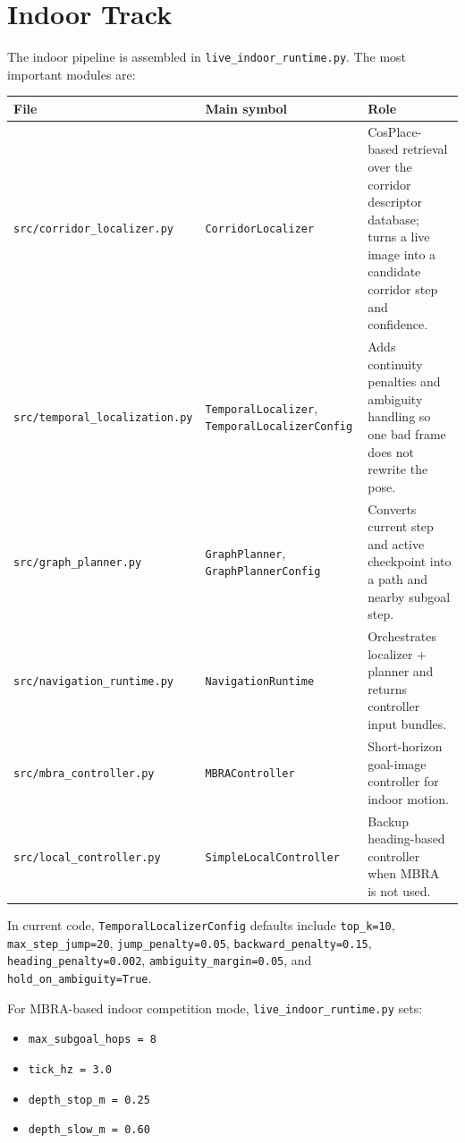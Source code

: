 \documentclass[11pt]{article}
\begin{document}
\section{Indoor Track}

The indoor pipeline is assembled in \texttt{live\_indoor\_runtime.py}. The most
important modules are:

\begin{longtable}{p{}p{}p{}}
\toprule
\textbf{File} & \textbf{Main symbol} & \textbf{Role} \\
\midrule
\texttt{src/corridor\_localizer.py} & \texttt{CorridorLocalizer} & CosPlace-based retrieval over the corridor descriptor database; turns a live image into a candidate corridor step and confidence. \\
\texttt{src/temporal\_localization.py} & \texttt{TemporalLocalizer}, \texttt{TemporalLocalizerConfig} & Adds continuity penalties and ambiguity handling so one bad frame does not rewrite the pose. \\
\texttt{src/graph\_planner.py} & \texttt{GraphPlanner}, \texttt{GraphPlannerConfig} & Converts current step and active checkpoint into a path and nearby subgoal step. \\
\texttt{src/navigation\_runtime.py} & \texttt{NavigationRuntime} & Orchestrates localizer + planner and returns controller input bundles. \\
\texttt{src/mbra\_controller.py} & \texttt{MBRAController} & Short-horizon goal-image controller for indoor motion. \\
\texttt{src/local\_controller.py} & \texttt{SimpleLocalController} & Backup heading-based controller when MBRA is not used. \\
\bottomrule
\end{longtable}

In current code, \texttt{TemporalLocalizerConfig} defaults include
\texttt{top\_k=10}, \texttt{max\_step\_jump=20}, \texttt{jump\_penalty=0.05},
\texttt{backward\_penalty=0.15}, \texttt{heading\_penalty=0.002},
\texttt{ambiguity\_margin=0.05}, and \texttt{hold\_on\_ambiguity=True}.

For MBRA-based indoor competition mode, \texttt{live\_indoor\_runtime.py} sets:

\begin{itemize}[nosep]
  \item \texttt{max\_subgoal\_hops = 8}
  \item \texttt{tick\_hz = 3.0}
  \item \texttt{depth\_stop\_m = 0.25}
  \item \texttt{depth\_slow\_m = 0.60}
\end{itemize}
\end{document}
